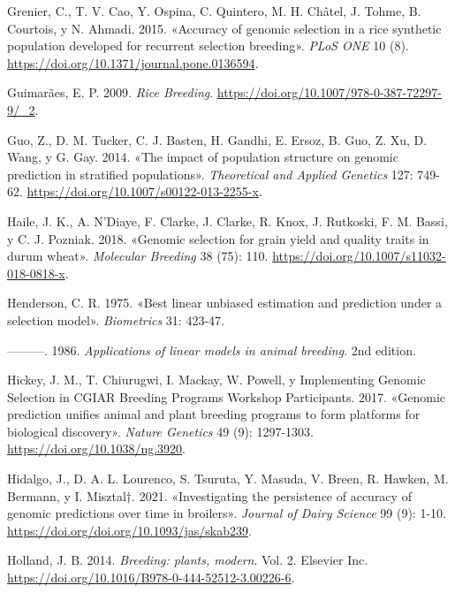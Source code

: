 \documentclass[11pt,spanish,a4paper,oneside,]{book} %
\begin{document}
\leavevmode\hypertarget{ref-cite:65}{}%
Grenier, C., T. V. Cao, Y. Ospina, C. Quintero, M. H. Châtel, J. Tohme, B. Courtois, y N. Ahmadi. 2015. «Accuracy of genomic selection in a rice synthetic population developed for recurrent selection breeding». \emph{PLoS ONE} 10 (8). \url{https://doi.org/10.1371/journal.pone.0136594}.

\leavevmode\hypertarget{ref-cite:62}{}%
Guimarães, E. P. 2009. \emph{Rice Breeding}. \url{https://doi.org/10.1007/978-0-387-72297-9/_2}.

\leavevmode\hypertarget{ref-cite:70}{}%
Guo, Z., D. M. Tucker, C. J. Basten, H. Gandhi, E. Ersoz, B. Guo, Z. Xu, D. Wang, y G. Gay. 2014. «The impact of population structure on genomic prediction in stratified populations». \emph{Theoretical and Applied Genetics} 127: 749-62. \url{https://doi.org/10.1007/s00122-013-2255-x}.

\leavevmode\hypertarget{ref-cite:81}{}%
Haile, J. K., A. N'Diaye, F. Clarke, J. Clarke, R. Knox, J. Rutkoski, F. M. Bassi, y C. J. Pozniak. 2018. «Genomic selection for grain yield and quality traits in durum wheat». \emph{Molecular Breeding} 38 (75): 110. \url{https://doi.org/10.1007/s11032-018-0818-x}.

\leavevmode\hypertarget{ref-cite:41}{}%
Henderson, C. R. 1975. «Best linear unbiased estimation and prediction under a selection model». \emph{Biometrics} 31: 423-47.

\leavevmode\hypertarget{ref-cite:67}{}%
---------. 1986. \emph{Applications of linear models in animal breeding}. 2nd edition.

\leavevmode\hypertarget{ref-cite:44}{}%
Hickey, J. M., T. Chiurugwi, I. Mackay, W. Powell, y Implementing Genomic Selection in CGIAR Breeding Programs Workshop Participants. 2017. «Genomic prediction unifies animal and plant breeding programs to form platforms for biological discovery». \emph{Nature Genetics} 49 (9): 1297-1303. \url{https://doi.org/10.1038/ng.3920}.

\leavevmode\hypertarget{ref-cite:89}{}%
Hidalgo, J., D. A. L. Lourenco, S. Tsuruta, Y. Masuda, V. Breen, R. Hawken, M. Bermann, y I. Misztal†. 2021. «Investigating the persistence of accuracy of genomic predictions over time in broilers». \emph{Journal of Dairy Science} 99 (9): 1-10. \url{https://doi.org/doi.org/10.1093/jas/skab239}.

\leavevmode\hypertarget{ref-cite:43}{}%
Holland, J. B. 2014. \emph{Breeding: plants, modern}. Vol. 2. Elsevier Inc. \url{https://doi.org/10.1016/B978-0-444-52512-3.00226-6}.
\end{document}
